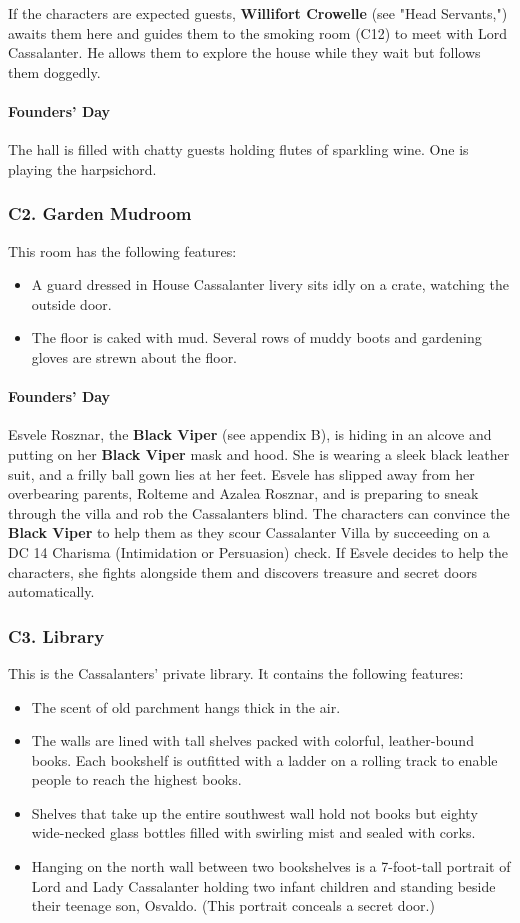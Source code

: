 \documentclass[10pt,a4paper,twoside,twocolumn,openany,nodeprecatedcode]{dndbook}
\begin{document}
If the characters are expected guests, \textbf{Willifort Crowelle} (see "Head Servants,") awaits them here and guides them to the smoking room (C12) to meet with Lord Cassalanter. He allows them to explore the house while they wait but follows them doggedly.
\paragraph{Founders' Day}
The hall is filled with chatty guests holding flutes of sparkling wine. One is playing the harpsichord.
\subsubsection{C2. Garden Mudroom}
This room has the following features:
\begin{itemize}

\item A guard dressed in House Cassalanter livery sits idly on a crate, watching the outside door.
\item The floor is caked with mud. Several rows of muddy boots and gardening gloves are strewn about the floor.
\end{itemize}


\paragraph{Founders' Day}
Esvele Rosznar, the \textbf{Black Viper} (see appendix B), is hiding in an alcove and putting on her \textbf{Black Viper} mask and hood. She is wearing a sleek black leather suit, and a frilly ball gown lies at her feet. Esvele has slipped away from her overbearing parents, Rolteme and Azalea Rosznar, and is preparing to sneak through the villa and rob the Cassalanters blind.
The characters can convince the \textbf{Black Viper} to help them as they scour Cassalanter Villa by succeeding on a DC 14 Charisma (Intimidation or Persuasion) check. If Esvele decides to help the characters, she fights alongside them and discovers treasure and secret doors automatically.
\subsubsection{C3. Library}
This is the Cassalanters' private library. It contains the following features:
\begin{itemize}

\item The scent of old parchment hangs thick in the air.
\item The walls are lined with tall shelves packed with colorful, leather-bound books. Each bookshelf is outfitted with a ladder on a rolling track to enable people to reach the highest books.
\item Shelves that take up the entire southwest wall hold not books but eighty wide-necked glass bottles filled with swirling mist and sealed with corks.
\item Hanging on the north wall between two bookshelves is a 7-foot-tall portrait of Lord and Lady Cassalanter holding two infant children and standing beside their teenage son, Osvaldo. (This portrait conceals a secret door.)
\end{itemize}
\end{document}
